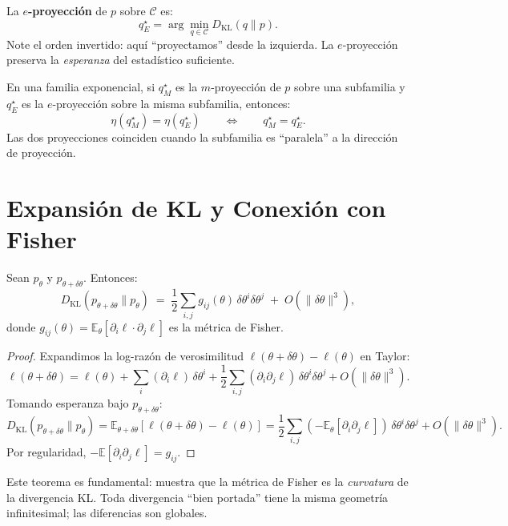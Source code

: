 \begin{definition}[$e$-proyección]
	La \textbf{$e$-proyección} de $p$ sobre $\mathcal{C}$ es:
	\[
	q^\star_E = \arg\min_{q \in \mathcal{C}} D_{\mathrm{KL}}(q \| p).
	\]
	Note el orden invertido: aquí ``proyectamos'' desde la izquierda.  La $e$-proyección preserva la \emph{esperanza} del estadístico suficiente.
\end{definition}

\begin{theorem}
	En una familia exponencial, si $q^\star_M$ es la $m$-proyección de $p$ sobre una subfamilia y $q^\star_E$ es la $e$-proyección sobre la misma subfamilia, entonces:
	\[
	\eta(q^\star_M) = \eta(q^\star_E) \qquad \Longleftrightarrow \qquad q^\star_M = q^\star_E.
	\]
	Las dos proyecciones coinciden cuando la subfamilia es ``paralela'' a la dirección de proyección.
\end{theorem}

\section{Expansión de KL y Conexión con Fisher}

\begin{theorem}
	Sean $p_\theta$ y $p_{\theta + \delta\theta}$.  Entonces:
	\[
	D_{\mathrm{KL}}(p_{\theta+\delta\theta} \| p_\theta) \;=\; \frac{1}{2} \sum_{i,j} g_{ij}(\theta)\, \delta\theta^i \delta\theta^j \;+\; O(\|\delta\theta\|^3),
	\]
	donde $g_{ij}(\theta) = \mathbb{E}_\theta[\partial_i \ell \cdot \partial_j \ell]$ es la métrica de Fisher.
\end{theorem}

\begin{proof}
	Expandimos la log-razón de verosimilitud $\ell(\theta + \delta\theta) - \ell(\theta)$ en Taylor:
	\[
	\ell(\theta + \delta\theta) = \ell(\theta) + \sum_i (\partial_i \ell)\,\delta\theta^i + \frac{1}{2}\sum_{i,j}(\partial_i \partial_j \ell)\,\delta\theta^i \delta\theta^j + O(\|\delta\theta\|^3).
	\]
	Tomando esperanza bajo $p_{\theta+\delta\theta}$:
	\[
	D_{\mathrm{KL}}(p_{\theta+\delta\theta} \| p_\theta) = \mathbb{E}_{\theta+\delta\theta}[\ell(\theta+\delta\theta) - \ell(\theta)] = \frac{1}{2}\sum_{i,j}(-\mathbb{E}_{\theta}[\partial_i\partial_j\ell])\,\delta\theta^i\delta\theta^j + O(\|\delta\theta\|^3).
	\]
	Por regularidad, $-\mathbb{E}[\partial_i\partial_j\ell] = g_{ij}$.
\end{proof}

Este teorema es fundamental: muestra que la métrica de Fisher es la \emph{curvatura} de la divergencia KL.  Toda divergencia ``bien portada'' tiene la misma geometría infinitesimal; las diferencias son globales.

